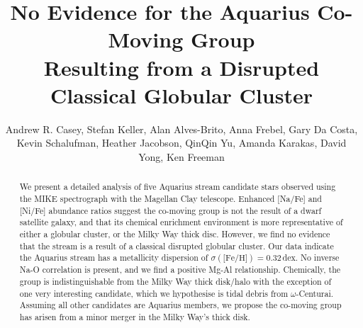 \documentclass{emulateapj}
\begin{document}
\title{No Evidence for the Aquarius Co-Moving Group \\Resulting from a Disrupted Classical Globular Cluster}



\author{Andrew R. Casey, Stefan Keller, Alan Alves-Brito, Anna Frebel, Gary Da Costa, Kevin Schalufman, Heather Jacobson, QinQin Yu, Amanda Karakas, David Yong, Ken Freeman}


\begin{abstract}
We present a detailed analysis of five Aquarius stream candidate stars observed using the MIKE spectrograph with the Magellan Clay telescope.  Enhanced [Na/Fe] and [Ni/Fe] abundance ratios suggest the co-moving group is not the result of a dwarf satellite galaxy, and that its chemical enrichment environment is more representative of either a globular cluster, or the Milky Way thick disc. However, we find no evidence that the stream is a result of a classical disrupted globular cluster. Our data indicate the Aquarius stream has a  metallicity dispersion of $\sigma(\mbox{[Fe/H}]) = 0.32$\,dex. No inverse Na-O correlation is present, and we find a positive Mg-Al relationship. Chemically, the group is indistinguishable from the Milky Way thick disk/halo with the exception of one very interesting candidate, which we hypothesise is tidal debris from $\omega$-Centurai. Assuming all other candidates are Aquarius members, we propose the co-moving group has arisen from a minor merger in the Milky Way's thick disk.

\end{abstract}
\end{document}
